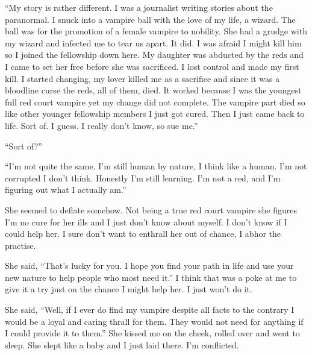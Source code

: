 ``My story is rather different. I was a journalist writing stories about the paranormal. I snuck into a vampire ball with the love of my life, a wizard. The ball was for the promotion of a female vampire to nobility. She had a grudge with my wizard and infected me to tear us apart. It did. I was afraid I might kill him so I joined the fellowship down here. My daughter was abducted by the reds and I came to set her free before she was sacrificed. I lost control and made my first kill. I started changing, my lover killed me as a sacrifice and since it was a bloodline curse the reds, all of them, died. It worked because I was the youngest full red court vampire yet my change did not complete.  The vampire part died so like other younger fellowship members I just got cured. Then I just came back to life. Sort of. I guess. I really don't know, so sue me.''

``Sort of?''

``I'm not quite the same. I'm still human by nature, I think like a human. I'm not corrupted I don't think. Honestly I'm still learning. I'm not a red, and I'm figuring out what I actually am.''

She seemed to deflate somehow. Not being a true red court vampire she figures I'm no cure for her ills and I just don't know about myself. I don't know if I could help her. I sure don't want to enthrall her out of chance, I abhor the practise.

She said, ``That's lucky for you. I hope you find your path in life and use your new nature to help people who most need it.'' I think that was a poke at me to give it a try just on the chance I might help her. I just won't do it.

She said, ``Well, if I ever do find my vampire despite all facts to the contrary I would be a loyal and caring thrall for them. They would not need for anything if I could provide it to them.'' She kissed me on the cheek, rolled over and went to sleep. She slept like a baby and I just laid there. I'm conflicted.

